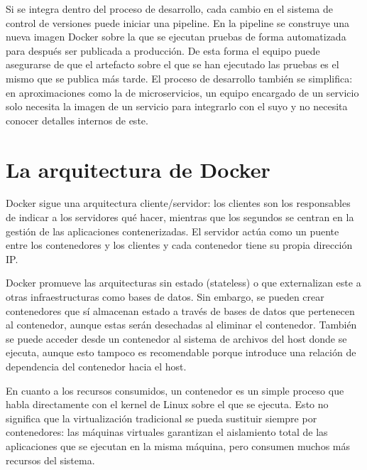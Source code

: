 \documentclass[11pt,a4paper]{article}
\begin{document}
Si se integra dentro del proceso de desarrollo, cada cambio en el sistema de control de versiones puede iniciar una pipeline. En la pipeline se construye una nueva imagen Docker sobre la que se ejecutan pruebas de forma automatizada para después ser publicada a producción. De esta forma el equipo puede asegurarse de que el artefacto sobre el que se han ejecutado las pruebas es el mismo que se publica más tarde. El proceso de desarrollo también se simplifica: en aproximaciones como la de microservicios, un equipo encargado de un servicio solo necesita la imagen de un servicio para integrarlo con el suyo y no necesita conocer detalles internos de este. 

\section{La arquitectura de Docker}

Docker sigue una arquitectura cliente/servidor: los clientes son los responsables de indicar a los servidores qué hacer, mientras que los segundos se centran en la gestión de las aplicaciones contenerizadas. El servidor actúa como un puente entre los contenedores y los clientes y cada contenedor tiene su propia dirección IP.

Docker promueve las arquitecturas sin estado (stateless) o que externalizan este a otras infraestructuras como bases de datos. Sin embargo, se pueden crear contenedores que sí almacenan estado a través de bases de datos que pertenecen al contenedor, aunque estas serán desechadas al eliminar el contenedor. También se puede acceder desde un contenedor al sistema de archivos del host donde se ejecuta, aunque esto tampoco es recomendable porque introduce una relación de dependencia del contenedor hacia el host. 

En cuanto a los recursos consumidos, un contenedor es un simple proceso que habla directamente con el kernel de Linux sobre el que se ejecuta. Esto no significa que la virtualización tradicional se pueda sustituir siempre por contenedores: las máquinas virtuales garantizan el aislamiento total de las aplicaciones que se ejecutan en la misma máquina, pero consumen muchos más recursos del sistema.
\end{document}
